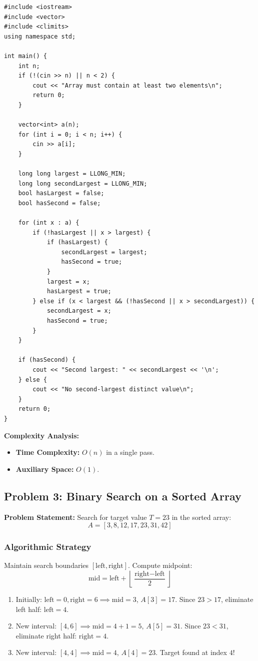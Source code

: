 \begin{lstlisting}[style=cppstyle, caption={C++ Solution for Finding Second-Largest Distinct Element.}]
#include <iostream>
#include <vector>
#include <climits>
using namespace std;

int main() {
    int n;
    if (!(cin >> n) || n < 2) {
        cout << "Array must contain at least two elements\n";
        return 0;
    }

    vector<int> a(n);
    for (int i = 0; i < n; i++) {
        cin >> a[i];
    }

    long long largest = LLONG_MIN;
    long long secondLargest = LLONG_MIN;
    bool hasLargest = false;
    bool hasSecond = false;

    for (int x : a) {
        if (!hasLargest || x > largest) {
            if (hasLargest) {
                secondLargest = largest;
                hasSecond = true;
            }
            largest = x;
            hasLargest = true;
        } else if (x < largest && (!hasSecond || x > secondLargest)) {
            secondLargest = x;
            hasSecond = true;
        }
    }

    if (hasSecond) {
        cout << "Second largest: " << secondLargest << '\n';
    } else {
        cout << "No second-largest distinct value\n";
    }
    return 0;
}
\end{lstlisting}

\textbf{Complexity Analysis:}
\begin{itemize}
    \item \textbf{Time Complexity:} $O(n)$ in a single pass.
    \item \textbf{Auxiliary Space:} $O(1)$.
\end{itemize}

\subsection{Problem 3: Binary Search on a Sorted Array}

\textbf{Problem Statement:} Search for target value $T = 23$ in the sorted array:
\[
A = [3, 8, 12, 17, 23, 31, 42]
\]

\subsubsection*{Algorithmic Strategy}
Maintain search boundaries $[\text{left}, \text{right}]$. Compute midpoint:
\[
\text{mid} = \text{left} + \left\lfloor \frac{\text{right} - \text{left}}{2} \right\rfloor
\]
\begin{enumerate}
    \item Initially: $\text{left} = 0, \text{right} = 6 \implies \text{mid} = 3$, $A[3] = 17$. Since $23 > 17$, eliminate left half: $\text{left} = 4$.
    \item New interval: $[4, 6] \implies \text{mid} = 4 + 1 = 5$, $A[5] = 31$. Since $23 < 31$, eliminate right half: $\text{right} = 4$.
    \item New interval: $[4, 4] \implies \text{mid} = 4$, $A[4] = 23$. Target found at index $4$!
\end{enumerate}

